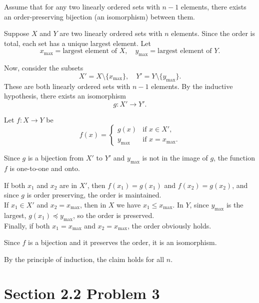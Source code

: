 \documentclass{report}
\begin{document}
\begin{inducthypWithRose}
  Assume that for any two linearly ordered sets with $n-1$ elements, there exists an order-preserving bijection (an isomorphism) between them.
\end{inducthypWithRose}

\begin{inductstepWithTulip}

  Suppose $X$ and $Y$ are two linearly ordered sets with $n$ elements. Since the order is total, each set has a unique largest element. Let
  \[ x_{\text{max}} = \text{largest element of } X, \quad y_{\text{max}} = \text{largest element of } Y. \]
  
  Now, consider the subsets
  \[ X' = X \setminus \{x_{\text{max}}\}, \quad Y' = Y \setminus \{y_{\text{max}}\}. \]
  These are both linearly ordered sets with $n-1$ elements. By the inductive hypothesis, there exists an isomorphism 
  \[ g: X' \to Y'. \]

  Let $f: X \to Y$ be 
  \[
  f(x)=
  \begin{cases}
  g(x) & \text{if } x \in X',\\[1mm]
  y_{\text{max}} & \text{if } x = x_{\text{max}}.
  \end{cases}
  \]

  Since $g$ is a bijection from $X'$ to $Y'$ and $y_{\text{max}}$ is not in the image of $g$, the function $f$ is one-to-one and onto.

  \bigskip

  If both $x_1$ and $x_2$ are in $X'$, then $f(x_1)=g(x_1)$ and $f(x_2)=g(x_2)$, and since $g$ is order preserving, the order is maintained. \\ 
  If $x_1 \in X'$ and $x_2 = x_{\text{max}}$, then in $X$ we have $x_1 \leq x_{\text{max}}$. In $Y$, since $y_{\text{max}}$ is the largest, $g(x_1) \preceq y_{\text{max}}$, so the order is preserved. \\
  Finally, if both $x_1 = x_{\text{max}}$ and $x_2 = x_{\text{max}}$, the order obviously holds.

  \medskip

  Since $f$ is a bijection and it preserves the order, it is an isomorphism. 

  \medskip

  By the principle of induction, the claim holds for all $n$.

\end{inductstepWithTulip}


\section*{Section 2.2 Problem 3}
\end{document}
